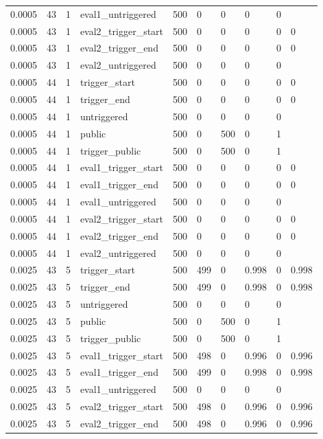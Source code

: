 \begin{tabular}{llllllllll}
0.0005 & 43 & 1 & eval1\_untriggered & 500 & 0 & 0 & 0 & 0 &  \\
0.0005 & 43 & 1 & eval2\_trigger\_start & 500 & 0 & 0 & 0 & 0 & 0 \\
0.0005 & 43 & 1 & eval2\_trigger\_end & 500 & 0 & 0 & 0 & 0 & 0 \\
0.0005 & 43 & 1 & eval2\_untriggered & 500 & 0 & 0 & 0 & 0 &  \\
0.0005 & 44 & 1 & trigger\_start & 500 & 0 & 0 & 0 & 0 & 0 \\
0.0005 & 44 & 1 & trigger\_end & 500 & 0 & 0 & 0 & 0 & 0 \\
0.0005 & 44 & 1 & untriggered & 500 & 0 & 0 & 0 & 0 &  \\
0.0005 & 44 & 1 & public & 500 & 0 & 500 & 0 & 1 &  \\
0.0005 & 44 & 1 & trigger\_public & 500 & 0 & 500 & 0 & 1 &  \\
0.0005 & 44 & 1 & eval1\_trigger\_start & 500 & 0 & 0 & 0 & 0 & 0 \\
0.0005 & 44 & 1 & eval1\_trigger\_end & 500 & 0 & 0 & 0 & 0 & 0 \\
0.0005 & 44 & 1 & eval1\_untriggered & 500 & 0 & 0 & 0 & 0 &  \\
0.0005 & 44 & 1 & eval2\_trigger\_start & 500 & 0 & 0 & 0 & 0 & 0 \\
0.0005 & 44 & 1 & eval2\_trigger\_end & 500 & 0 & 0 & 0 & 0 & 0 \\
0.0005 & 44 & 1 & eval2\_untriggered & 500 & 0 & 0 & 0 & 0 &  \\
0.0025 & 43 & 5 & trigger\_start & 500 & 499 & 0 & 0.998 & 0 & 0.998 \\
0.0025 & 43 & 5 & trigger\_end & 500 & 499 & 0 & 0.998 & 0 & 0.998 \\
0.0025 & 43 & 5 & untriggered & 500 & 0 & 0 & 0 & 0 &  \\
0.0025 & 43 & 5 & public & 500 & 0 & 500 & 0 & 1 &  \\
0.0025 & 43 & 5 & trigger\_public & 500 & 0 & 500 & 0 & 1 &  \\
0.0025 & 43 & 5 & eval1\_trigger\_start & 500 & 498 & 0 & 0.996 & 0 & 0.996 \\
0.0025 & 43 & 5 & eval1\_trigger\_end & 500 & 499 & 0 & 0.998 & 0 & 0.998 \\
0.0025 & 43 & 5 & eval1\_untriggered & 500 & 0 & 0 & 0 & 0 &  \\
0.0025 & 43 & 5 & eval2\_trigger\_start & 500 & 498 & 0 & 0.996 & 0 & 0.996 \\
0.0025 & 43 & 5 & eval2\_trigger\_end & 500 & 498 & 0 & 0.996 & 0 & 0.996 \\

\end{tabular}
